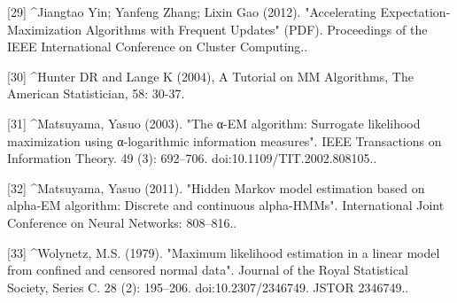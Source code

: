 [29]
^Jiangtao Yin; Yanfeng Zhang; Lixin Gao (2012). "Accelerating Expectation-Maximization Algorithms with Frequent Updates" (PDF). Proceedings of the IEEE International Conference on Cluster Computing..

[30]
^Hunter DR and Lange K (2004), A Tutorial on MM Algorithms, The American Statistician, 58: 30-37.

[31]
^Matsuyama, Yasuo (2003). "The α-EM algorithm: Surrogate likelihood maximization using α-logarithmic information measures". IEEE Transactions on Information Theory. 49 (3): 692–706. doi:10.1109/TIT.2002.808105..

[32]
^Matsuyama, Yasuo (2011). "Hidden Markov model estimation based on alpha-EM algorithm: Discrete and continuous alpha-HMMs". International Joint Conference on Neural Networks: 808–816..

[33]
^Wolynetz, M.S. (1979). "Maximum likelihood estimation in a linear model from confined and censored normal data". Journal of the Royal Statistical Society, Series C. 28 (2): 195–206. doi:10.2307/2346749. JSTOR 2346749..